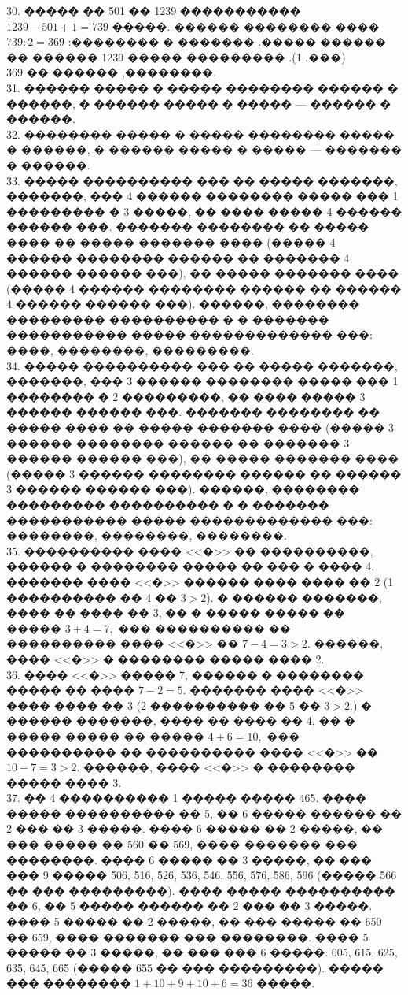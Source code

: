 \documentclass[12pt]{article}
\begin{document}
30. ����� �� 501 �� 1239 ����������� $1239-501+1=739$ �����. ׸���� �������� ������ ������ �����. ������� � ��������: $739:2=369$ (���. 1). ��������� ����� 1239 ������ �� ��������, ������ �� 369.\\
31. ������ ����� � ����� �������� ������ � ������, � ������ ����� � ����� --- ������ � ������.\\
32. �������� ����� � ����� �������� ����� � ������, � ������ ����� � ����� --- ������� � ������.\\
33. ����� ���������� ��� �� ����� �������, �������, ��� 4 ������ �������� ����� ��� 1 ��������� � 3 �����, �� ���� ����� 4 ������ ������ ���. ������� �������� �� ����� ���� �� ����� ������� ���� (����� 4 ������ �������� ������ �� ������� 4 ������ ������ ���), �� ����� ������� ���� (����� 4 ������ �������� ������ �� ������ 4 ������ ������ ���). ������, �������� ��������� ���������� � � ������� ����������� ����� ������������� ���: ����, ��������, ���������.\\
34. ����� ���������� ��� �� ����� �������, �������, ��� 3 ������ �������� ����� ��� 1 �������� � 2 ���������, �� ���� ����� 3 ������ ������ ���. ������� �������� �� ����� ���� �� ����� ������� ���� (����� 3 ������ �������� ������ �� ������� 3 ������ ������ ���), �� ����� ������� ���� (����� 3 ������ �������� ������ �� ������ 3 ������ ������ ���). ������, �������� ��������� ���������� � � ������� ����������� ����� ������������� ���: ��������, ��������, ��������.\\
35. ���������� ���� <<�>> �� ����������, ������ � �������� ����� �� ��� � ���� 4. ������� ���� <<�>> ������ ���� ���� �� 2 (1 ���������� �� 4 �� $3>2$). � ������ �������, ���� �� ���� �� 3, �� � ����� ����� �� ����� $3+4=7,$ ��� ���������� �� ���������� ���� <<�>> �� $7-4=3>2.$ ������, ���� <<�>> � �������� ����� ���� 2.\\
36. ���� <<�>> ����� 7, ������ � �������� ����� �� ���� $7-2=5.$ ������� ���� <<�>> ���� ���� �� 3 (2 ���������� �� 5 �� $3>2.$) � ������ �������, ���� �� ���� �� 4, �� � ����� �����  �� ����� $4+6=10,$ ��� ���������� �� ���������� ���� <<�>> �� $10-7=3>2.$ ������, ���� <<�>> � �������� ����� ���� 3.\\
37. �� 4 ���������� 1 ����� ����� 465. ���� ����� ���������� �� 5, �� 6 ����� ������ �� 2 ��� �� 3 �����. ���� 6 ����� �� 2 �����, �� ��� ����� �� 560 �� 569, ���� ������� ��� ��������. ���� 6 ����� �� 3 �����, �� ��� ��� 9 ����� 506, 516, 526, 536, 546, 556, 576, 586, 596 (����� 566 �� ��� ���������). ���� ����� ���������� �� 6, �� 5 ����� ������ �� 2 ��� �� 3 �����. ���� 5 ����� �� 2 �����, �� ��� ����� �� 650 �� 659, ���� ������� ��� ��������. ���� 5 ����� �� 3 �����, �� ��� ��� 6 �����: 605, 615, 625, 635, 645, 665 (����� 655 �� ��� ���������). ����� ��� �������� $1+10+9+10+6=36$ �����.\\
\end{document}
